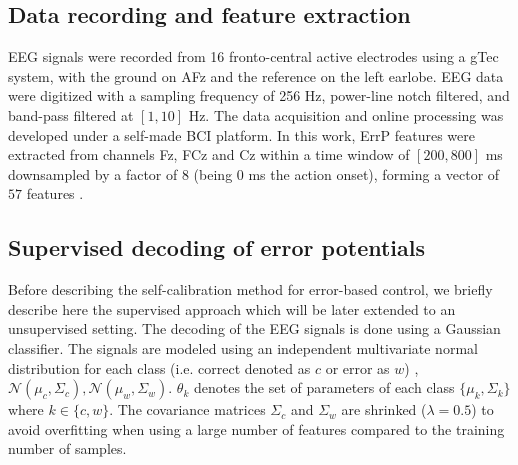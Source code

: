 \subsection{Data recording and feature extraction}

EEG signals were recorded from 16 fronto-central active electrodes using a gTec system, with the ground on AFz and the reference on the left earlobe. EEG data were digitized with a sampling frequency of 256 Hz, power-line notch filtered, and band-pass filtered at $[1, 10]$ Hz. The data acquisition and online processing was developed under a self-made BCI platform.
%
In this work, ErrP features were extracted from channels Fz, FCz and Cz within a time window of $[200,800]$ ms downsampled by a factor of 8 (being 0 ms the action onset), forming a vector of $57$ features \cite{chavarriaga2010learning}.





\subsection{Supervised decoding of error potentials}

Before describing the self-calibration method for error-based control, we briefly describe here the supervised approach \cite{chavarriaga2010learning, iturrate13} which will be later extended to an unsupervised setting.
%
The decoding of the EEG signals is done using a Gaussian classifier.  The signals are modeled using an independent multivariate normal distribution for each class (i.e. correct denoted as $c$ or error as $w$) \cite{lotte2007review,blankertz2010single}, $\mathcal{N}(\mu_c, \Sigma_c), \mathcal{N}(\mu_w, \Sigma_w)$.  $\theta_k$ denotes  the set of parameters of each class  $\{\mu_k, \Sigma_k\}$ where $k\in\{c,w\}$.
%
The covariance matrices $\Sigma_c$ and $\Sigma_w$ are shrinked  ($\lambda = 0.5$) to avoid overfitting when using a large number of features compared to the training number of samples\cite{ledoit2004honey}.

